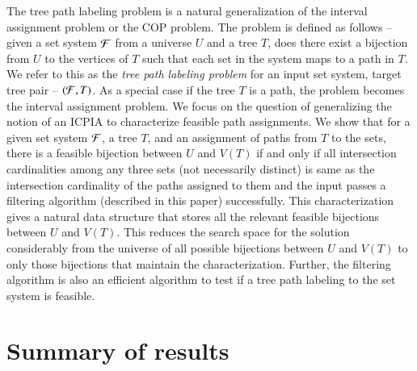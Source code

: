 \documentclass[MS,synopsis]{iitmdiss}
\def \un {\bf 1}
\begin{document}
The tree path labeling problem is a natural generalization of the
interval assignment problem or the COP problem. The problem is defined
as follows -- given a set system ${\cal F}$ from a universe $U$ and a tree
$T$, does there exist a bijection from $U$ to the vertices of $T$ such
that each set in the system maps to a path in $T$.  We refer to this
as the {\em tree path labeling problem} for an input set system,
target tree pair -- $({\cal F},T)$. As a special case if the tree $T$ is a
path, the problem becomes the interval assignment problem.  We focus
on the question of generalizing the notion of an ICPIA \cite{nsnrs09}
to characterize feasible path assignments.  We show that for a given
set system ${\cal F}$, a tree $T$, and an assignment of paths from $T$ to
the sets, there is a feasible bijection between $U$ and $V(T)$ if and
only if all intersection cardinalities among any three sets (not
necessarily distinct) is same as the intersection cardinality of the
paths assigned to them and the input passes a filtering algorithm
(described in this paper) successfully.  This characterization gives a
natural data structure that stores all the relevant feasible
bijections between $U$ and $V(T)$. This reduces the search space for
the solution considerably from the universe of all possible bijections
between $U$ and $V(T)$ to only those bijections that maintain the
characterization.  Further, the filtering algorithm
is also an efficient algorithm to test if a tree path labeling to the
set system is
feasible.  %





\section{Summary of results}
\label{sec:results}
\end{document}
